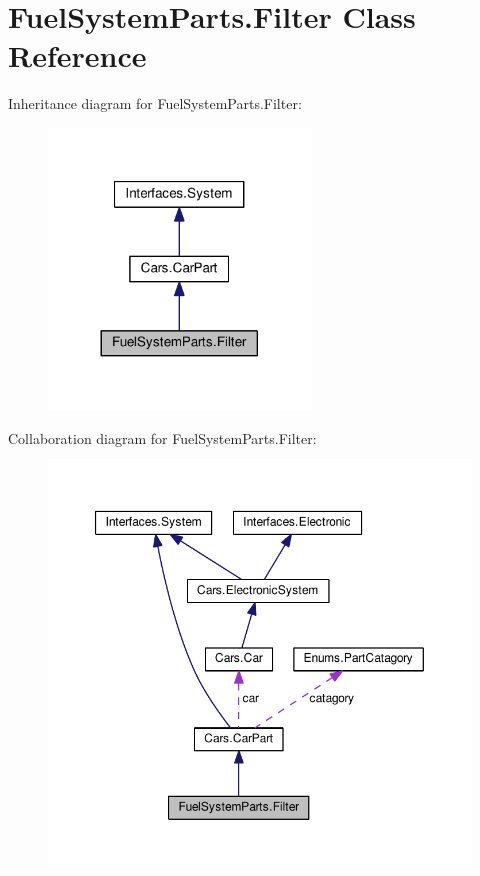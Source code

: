 \hypertarget{classFuelSystemParts_1_1Filter}{}\section{Fuel\+System\+Parts.\+Filter Class Reference}
\label{classFuelSystemParts_1_1Filter}


Inheritance diagram for Fuel\+System\+Parts.\+Filter\+:\nopagebreak
\begin{figure}[H]
\begin{center}
\leavevmode
\includegraphics[width=197pt]{classFuelSystemParts_1_1Filter__inherit__graph}
\end{center}
\end{figure}


Collaboration diagram for Fuel\+System\+Parts.\+Filter\+:\nopagebreak
\begin{figure}[H]
\begin{center}
\leavevmode
\includegraphics[width=350pt]{classFuelSystemParts_1_1Filter__coll__graph}
\end{center}
\end{figure}
